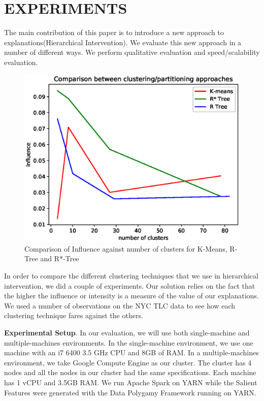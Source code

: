 \section{EXPERIMENTS}
\label{sec:evaluation}
The main contribution of this paper is to introduce a new approach to explanations(Hierarchical Intervention). We evaluate this new approach in a number of different ways. We perform qualitative evaluation and speed/scalability evaluation.

\begin{figure}[h]
	\includegraphics[width=\columnwidth]{images/clustering_comparison}
	\caption{Comparison of Influence against number of clusters for K-Means, R-Tree and R*-Tree}
	\label{fig:clustering_comparison}
\end{figure}

In order to compare the different clustering techniques that we use in hierarchical intervention, we did a couple of experiments. Our solution relies on the fact that the higher the influence or intensity is a measure of the value of our explanations. We used a number of observations on the NYC TLC data to see how each clustering technique fares against the others.

\textbf{Experimental Setup}. 
In our evaluation, we will use both single-machine and multiple-machines environments. 
In the single-machine environment, we use one machine with an i7 6400 3.5 GHz CPU and 8GB of RAM. 
In a multiple-machines environment, we take Google Compute Engine as our cluster. 
The cluster has 4 nodes and all the nodes in our cluster had the same specifications.
Each machine has 1 vCPU and 3.5GB RAM.
We run Apache Spark on YARN while the Salient Features were generated with the Data Polygamy Framework running on YARN. 

